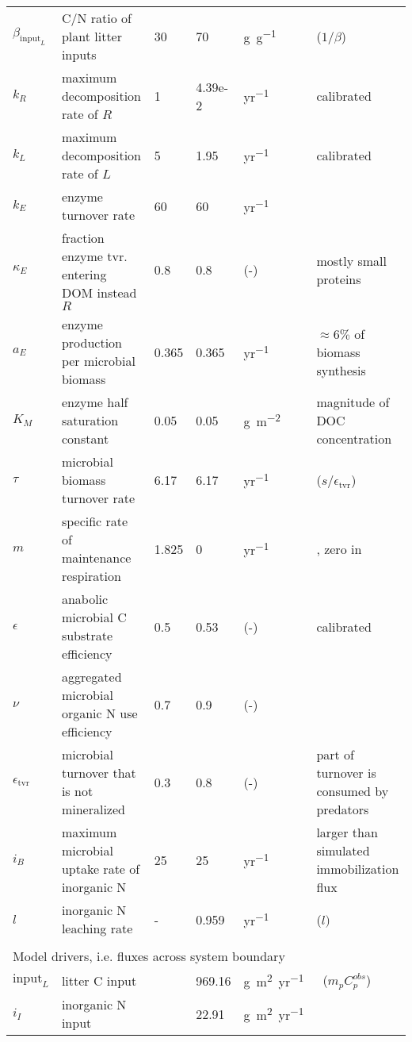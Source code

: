 \begin{table}[t]
\begin{tabular}{lp{6cm}lllp{5.5cm}}
$\beta_{\mathrm{input}_L}$ &  C/N ratio of plant litter inputs & 30 & 70 &
\unit{g~g^{-1}} & \citep{Perveen14} ($1/\beta$) \\
$k_R$ &  maximum decomposition rate of $R$ & 1 & 4.39e-2 & \unit{yr^{-1}}
& calibrated \\
$k_L$ &  maximum decomposition rate of $L$ & 5 & 1.95 & \unit{yr^{-1}}
& calibrated \\
$k_E$ &  enzyme turnover rate &  60  & 60 & \unit{yr^{-1}} & \citep{Burns13} \\
$\kappa_E$ & fraction enzyme tvr. entering DOM instead $R$ & 
0.8 & 0.8 & (-) & mostly small proteins \\
$a_{E}$ &  enzyme production per microbial biomass & 0.365 & 0.365 &
\unit{yr^{-1}} & $\approx 6\%$ of biomass synthesis \\ 
$K_{M}$ &  enzyme half saturation constant & 0.05 & 0.05 &
\unit{g~m^{-2}} & magnitude of DOC concentration \\
$\tau$ &  microbial biomass turnover rate & 6.17 & 6.17 & \unit{yr^{-1}} &
\citep{Perveen14} ($s/\epsilon_{\operatorname{tvr}}$) \\
$m$ & specific rate of maintenance respiration & 1.825 & 0 & 
\unit{yr^{-1}} & \citep{Bodegom07}, zero in \citep{Perveen14} \\
$\epsilon$ & anabolic microbial C substrate efficiency & 0.5 & 0.53 &
(-) & calibrated \\ %
$\nu$ & aggregated microbial organic N use efficiency & 0.7 &
0.9 & (-) & \citep{Manzoni08} \\
$\epsilon_{\operatorname{tvr}}$ & microbial turnover that is not
mineralized & 0.3 & 0.8 & (-) & part of turnover is consumed by
predators
\\
$i_{B}$ & maximum microbial uptake rate of inorganic N & 25 & 25 &
\unit{yr^{-1}} & larger than simulated immobilization flux \\
$l$ & inorganic N leaching rate & - & 0.959 &
\unit{yr^{-1}} & \citep{Perveen14} ($l)$ \\
\\
\multicolumn{6}{l}{Model drivers, i.e. fluxes across system boundary}  \\ 
$\mathrm{input}_{L}$ & litter C input & & 969.16 &
\unit{g~m^2yr^{-1}} & \citep{Perveen14} \, ($m_p C^{obs}_p$)\\
$i_{I}$ & inorganic N input & & 22.91 & \unit{g~m^2yr^{-1}} 
& \citep{Perveen14} \\

\end{tabular}
\end{table}
